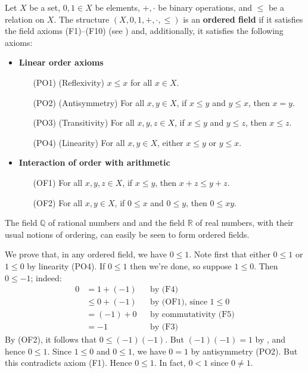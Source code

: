 \begin{axioms}
\label{axOrderedField}
Let $X$ be a set, $0,1 \in X$ be elements, $+,{\cdot}$ be binary operations, and $\le$ be a relation on $X$. The structure $(X,0,1,+,{\cdot},{\le})$ is an \textbf{ordered field} if it satisfies the field axioms (F1)--(F10) (see ) and, additionally, it satisfies the following axioms:
\begin{itemize}
\item \textbf{Linear order axioms}
\begin{itemize}[leftmargin=30pt]
\item[(PO1)] (Reflexivity) $x \le x$ for all $x \in X$.
\item[(PO2)] (Antisymmetry) For all $x,y \in X$, if $x \le y$ and $y \le x$, then $x=y$.
\item[(PO3)] (Transitivity) For all $x,y,z \in X$, if $x \le y$ and $y \le z$, then $x \le z$.
\item[(PO4)] (Linearity) For all $x,y \in X$, either $x \le y$ or $y \le x$.
\end{itemize}
\item \textbf{Interaction of order with arithmetic}
\begin{itemize}[leftmargin=30pt]
\item[(OF1)] For all $x,y,z \in X$, if $x \le y$, then $x+z \le y+z$.
\item[(OF2)] For all $x,y \in X$, if $0 \le x$ and $0 \le y$, then $0 \le xy$. 
\end{itemize}
\end{itemize}
\end{axioms}

\begin{example}
\label{exQRAreOrderedFields}
The field $\mathbb{Q}$ of rational numbers and and the field $\mathbb{R}$ of real numbers, with their usual notions of ordering, can easily be seen to form ordered fields.
\end{example}

\begin{example}
\label{exZeroIsLessThanOne}
We prove that, in any ordered field, we have $0 \le 1$. Note first that either $0 \le 1$ or $1 \le 0$ by linearity (PO4). If $0 \le 1$ then we're done, so suppose $1 \le 0$. Then $0 \le -1$; indeed:
\begin{align*}
0 &= 1 + (-1) && \text{by (F4)} \\
&\le 0+(-1) && \text{by (OF1), since $1 \le 0$} \\
&= (-1)+0 && \text{by commutativity (F5)} \\
&= -1 && \text{by (F3)}
\end{align*}
By (OF2), it follows that $0 \le (-1)(-1)$. But $(-1)(-1)=1$ by , and hence $0 \le 1$. Since $1 \le 0$ and $0 \le 1$, we have $0=1$ by antisymmetry (PO2). But this contradicts axiom (F1). Hence $0 \le 1$. In fact, $0<1$ since $0 \ne 1$.
\end{example}

